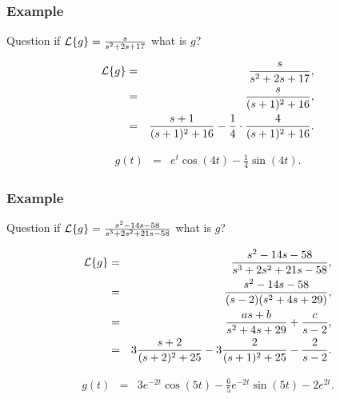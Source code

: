 \begin{frame}
  \frametitle{Example}

  \begin{block}{Question}
    if $\laplace{g}=\frac{s}{s^2+2s+17}$ what is $g$?
  \end{block}

    {
      \begin{eqnarray*}
        \laplace{g} & = & \frac{s}{s^2+2s+17}, \\
        & = & \frac{s}{(s+1)^2+16}, \\
        & = & \frac{s+1}{(s+1)^2+16} - \frac{1}{4}\cdot\frac{4}{(s+1)^2+16}.
      \end{eqnarray*}
    }

    {
      \begin{eqnarray*}
        g(t) & = & e^t\cos(4t) - \frac{1}{4}\sin(4t).
      \end{eqnarray*}
    }
  

\end{frame}


\begin{frame}
  \frametitle{Example}

  \begin{block}{Question}
    if $\laplace{g}=\frac{s^2-14s-58}{s^3+2s^2+21s-58}$ what is $g$?
  \end{block}

    {
      \begin{eqnarray*}
        \laplace{g} & = & \frac{s^2-14s-58}{s^3+2s^2+21s-58}, \\
        & = & \frac{s^2-14s-58}{(s-2)(s^2+4s+29)}, \\
        & = & \frac{as+b}{s^2+4s+29}+\frac{c}{s-2}, \\
        & = & 3\frac{s+2}{(s+2)^2+25} - 3\frac{2}{(s+1)^2+25}-\frac{2}{s-2}.
      \end{eqnarray*}
    }

    {
      \begin{eqnarray*}
        g(t) & = & 3e^{-2t}\cos(5t) - \frac{6}{5}e^{-2t}\sin(5t)-2e^{2t}.
      \end{eqnarray*}
    }
  

\end{frame}


